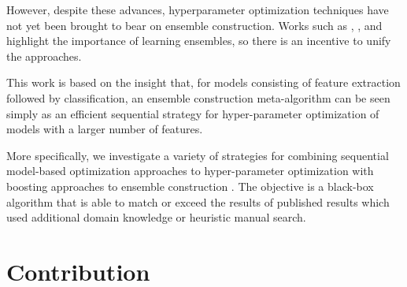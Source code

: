 \documentclass[11pt,twocolumn]{article}
\begin{document}
\vspace{11pt}
However, despite these advances, hyperparameter optimization techniques have not 
yet been brought to bear on ensemble construction.  Works such as \citet{gehler}, \citet{coates+lee+ng:2010},
and \citet{fg11} highlight the importance of learning ensembles, so there is an incentive
to unify the approaches.  

\vspace{11pt}
This work is based on the insight that, for models consisting of feature extraction followed by classification, 
an ensemble construction meta-algorithm can be seen simply as an
efficient sequential strategy for hyper-parameter optimization of 
models with a larger number of features.

\vspace{11pt}
More specifically, we investigate a variety of strategies for combining sequential model-based
optimization approaches to hyper-parameter optimization with boosting
approaches to ensemble construction \citep{mason,friedman}.  
The objective is a black-box algorithm that is able to match or exceed the
results of published results which used additional domain knowledge or
heuristic manual search.

\section{Contribution}
\end{document}
